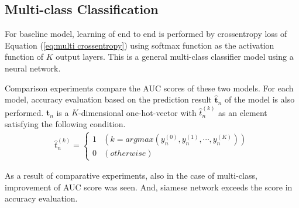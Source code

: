 \documentclass[twocolumn,10pt]{article}
\begin{document}
\subsection{Multi-class Classification}



For baseline model, learning of end to end is performed by crossentropy loss of Equation (\ref{eq:multi crossentropy}) using softmax function as the activation function of $K$ output layers.
This is a general multi-class classifier model using a neural network. \par
Comparison experiments compare the AUC scores of these two models.
For each model, accuracy evaluation based on the prediction result $\hat{\bm t}_n$ of the model is also performed.
$\hat{\bm t}_n$ is a $K$-dimensional one-hot-vector with $\hat{t}_n^{(k)}$ as an element satisfying the following condition.
\begin{align} \label{eq:accuracy}
\hat{t}_n^{(k)}=\left\{
\begin{array}{cc}
1 & (k = argmax(y_n^{(0)}, y_n^{(1)}, \cdots, y_n^{(K)})) \\ 
0 & (otherwise)
\end{array}
\right.
\end{align} \par
As a result of comparative experiments, also in the case of multi-class, improvement of AUC score was seen.
And, siamese network exceeds the score in accuracy evaluation.
\end{document}
